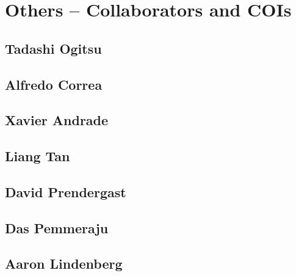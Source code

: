 \section{Others -- Collaborators and COIs}
\label{sec:coi}
\subsection{Tadashi Ogitsu}
\subsection{Alfredo Correa}
\subsection{Xavier Andrade}
\subsection{Liang Tan}
\subsection{David Prendergast}
\subsection{Das Pemmeraju}
\subsection{Aaron Lindenberg}

\clearpage
